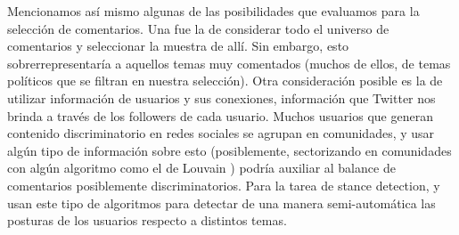 Mencionamos así mismo algunas de las posibilidades que evaluamos para la selección de comentarios. Una fue la de considerar todo el universo de comentarios y seleccionar la muestra de allí. Sin embargo, esto sobrerrepresentaría a aquellos temas muy comentados (muchos de ellos, de temas políticos que se filtran en nuestra selección). Otra consideración posible es la de utilizar información de usuarios y sus conexiones, información que Twitter nos brinda a través de los followers de cada usuario. Muchos usuarios que generan contenido discriminatorio en redes sociales se agrupan en comunidades, y usar algún tipo de información sobre esto (posiblemente, sectorizando en comunidades con algún algoritmo como el de Louvain \cite{blondel2008fast}) podría auxiliar al balance de comentarios posiblemente discriminatorios. Para la tarea de stance detection, \citet{lai2018stance} y \citet{furman2021you} usan este tipo de algoritmos para detectar de una manera semi-automática las posturas de los usuarios respecto a distintos temas.
